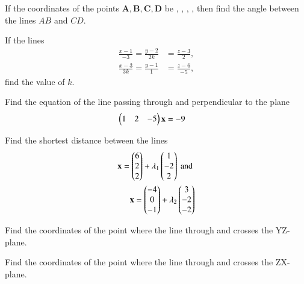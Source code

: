 \item If the coordinates of the points $\bm{A}, \bm{B}, \bm{C}, \bm{D}$ be , , , , then find the angle between the lines $AB$ and $CD$.  
%
\item If the lines 
\begin{align}
\frac{x-1}{-3} = \frac{y-2}{2k} &= \frac{z-3}{2}, 
\\
\frac{x-3}{3k} = \frac{y-1}{1} &= \frac{z-6}{-5} ,
\end{align}
find the value of $k$.
\item Find the  equation of the line passing through  and perpendicular to the plane %
\begin{align}
\begin{pmatrix}1 & 2 & -5\end{pmatrix}\mathbf{x}&=-9
\end{align}
\item Find the shortest distance between the lines 
%
\begin{align}
\mathbf{x} = \begin{pmatrix}6 \\ 2 \\ 2\end{pmatrix} + \lambda_1 \begin{pmatrix}1 \\ -2 \\ 2\end{pmatrix}  \text{ and }
\\
\mathbf{x} = \begin{pmatrix}-4 \\ 0 \\ -1\end{pmatrix} + \lambda_2 \begin{pmatrix}3 \\ -2 \\ -2\end{pmatrix}  
\end{align}
%
\item Find the coordinates of the point where the line through  and  crosses the YZ-plane.
\item Find the coordinates of the point where the line through  and  crosses the ZX-plane.
